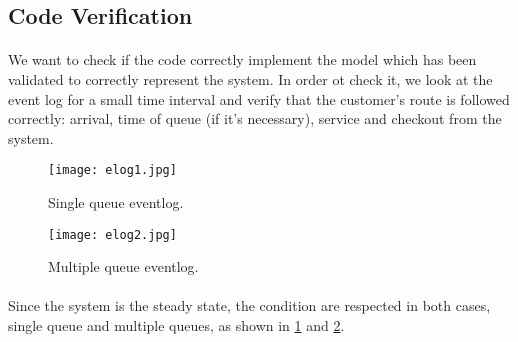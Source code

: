 \subsection{Code Verification}
\paragraph{}
We want to check if the code correctly implement the model which has been validated to correctly represent the system. In order ot check it, we look at the event log for a small time interval and verify that the customer's route is followed correctly: arrival, time of queue (if it's necessary), service and checkout from the system.

\begin{figure}[h]
  \begin{center}
  \texttt{[image: elog1.jpg]}
  \caption{Single queue eventlog.}
  \label{fig:elogs}
  \end{center}
\end{figure}
\begin{figure}[h]
  \begin{center}
  \texttt{[image: elog2.jpg]}
  \caption{Multiple queue eventlog.}
  \label{fig:elogm}
  \end{center}
\end{figure}

\paragraph{} Since the system is the steady state, the condition are respected in both cases, single queue and multiple queues, as shown in \ref{fig:elogs} and \ref{fig:elogm}.


